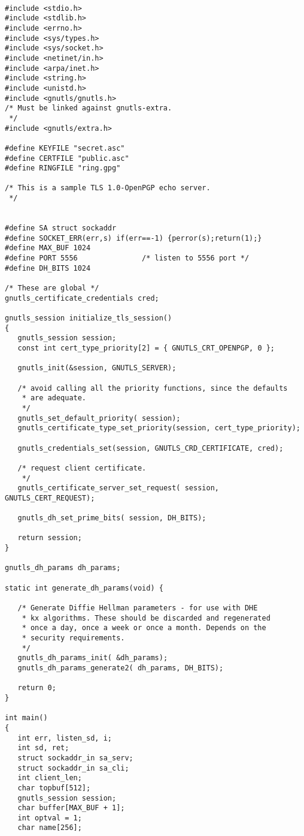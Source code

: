\begin{verbatim}

#include <stdio.h>
#include <stdlib.h>
#include <errno.h>
#include <sys/types.h>
#include <sys/socket.h>
#include <netinet/in.h>
#include <arpa/inet.h>
#include <string.h>
#include <unistd.h>
#include <gnutls/gnutls.h>
/* Must be linked against gnutls-extra.
 */
#include <gnutls/extra.h>

#define KEYFILE "secret.asc"
#define CERTFILE "public.asc"
#define RINGFILE "ring.gpg"

/* This is a sample TLS 1.0-OpenPGP echo server.
 */


#define SA struct sockaddr
#define SOCKET_ERR(err,s) if(err==-1) {perror(s);return(1);}
#define MAX_BUF 1024
#define PORT 5556               /* listen to 5556 port */
#define DH_BITS 1024

/* These are global */
gnutls_certificate_credentials cred;

gnutls_session initialize_tls_session()
{
   gnutls_session session;
   const int cert_type_priority[2] = { GNUTLS_CRT_OPENPGP, 0 };

   gnutls_init(&session, GNUTLS_SERVER);

   /* avoid calling all the priority functions, since the defaults
    * are adequate.
    */
   gnutls_set_default_priority( session);
   gnutls_certificate_type_set_priority(session, cert_type_priority);

   gnutls_credentials_set(session, GNUTLS_CRD_CERTIFICATE, cred);

   /* request client certificate.
    */
   gnutls_certificate_server_set_request( session, GNUTLS_CERT_REQUEST);

   gnutls_dh_set_prime_bits( session, DH_BITS);

   return session;
}

gnutls_dh_params dh_params;

static int generate_dh_params(void) {

   /* Generate Diffie Hellman parameters - for use with DHE
    * kx algorithms. These should be discarded and regenerated
    * once a day, once a week or once a month. Depends on the
    * security requirements.
    */
   gnutls_dh_params_init( &dh_params);
   gnutls_dh_params_generate2( dh_params, DH_BITS);

   return 0;
}

int main()
{
   int err, listen_sd, i;
   int sd, ret;
   struct sockaddr_in sa_serv;
   struct sockaddr_in sa_cli;
   int client_len;
   char topbuf[512];
   gnutls_session session;
   char buffer[MAX_BUF + 1];
   int optval = 1;
   char name[256];


\end{verbatim}
